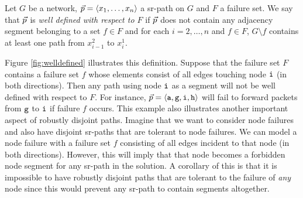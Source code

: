 
\begin{definition}
Let $G$ be a network, $\vec{p} = \langle x_1, \ldots, x_n \rangle$ a sr-path on $G$ and $F$ a failure set. We say that $\vec{p}$ is \emph{well defined
with respect to $F$} if $\vec{p}$ does not contain any adjacency segment belonging to a set $f \in F$
and for each $i = 2, \ldots, n$ and $f \in F$, $G \setminus f$ contains at least one path from $x^2_{i - 1}$ to $x^1_i$.
\end{definition}

Figure \ref{fig:welldefined} illustrates this definition. Suppose that the failure set $F$ contains a failure set $f$ whose
elements consist of all edges touching node $\texttt{i}$ (in both directions). Then any path using node $\texttt{i}$ as a segment
will not be well defined with respect to $F$. For instance, $\vec{p} = \langle \texttt{a}, \texttt{g}, \texttt{i}, \texttt{h} \rangle$
will fail to forward packets from $\texttt{g}$ to $\texttt{i}$ if failure $f$ occurs.
This example also illustrates another important aspect of robustly disjoint paths. Imagine that we want to consider node failures
and also have disjoint sr-paths that are tolerant to node failures. We can model a node failure with a failure set $f$ consisting
of all edges incident to that node (in both directions). However, this will imply that that node becomes a forbidden node segment for
any sr-path in the solution. A corollary of this is that it is impossible to have robustly disjoint paths that are tolerant to the failure of
\emph{any} node since this would prevent any sr-path to contain segments altogether.

